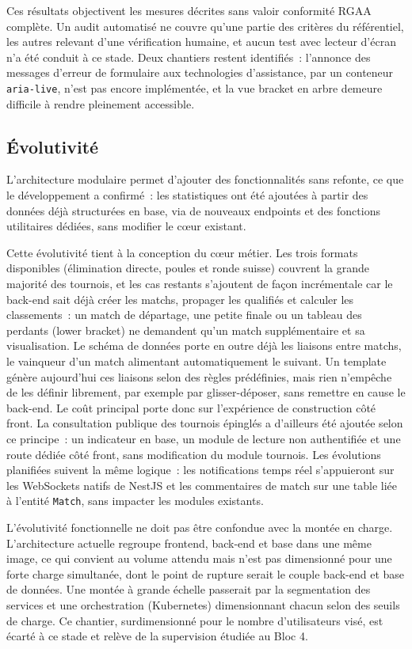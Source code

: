 Ces résultats objectivent les mesures décrites sans valoir conformité RGAA complète. Un audit automatisé ne couvre qu'une partie des critères du référentiel, les autres relevant d'une vérification humaine, et aucun test avec lecteur d'écran n'a été conduit à ce stade. Deux chantiers restent identifiés~: l'annonce des messages d'erreur de formulaire aux technologies d'assistance, par un conteneur \texttt{aria-live}, n'est pas encore implémentée, et la vue bracket en arbre demeure difficile à rendre pleinement accessible.

\subsection{Évolutivité}
L'architecture modulaire permet d'ajouter des fonctionnalités sans refonte, ce que le développement a confirmé~: les statistiques ont été ajoutées à partir des données déjà structurées en base, via de nouveaux endpoints et des fonctions utilitaires dédiées, sans modifier le cœur existant.

Cette évolutivité tient à la conception du cœur métier. Les trois formats disponibles (élimination directe, poules et ronde suisse) couvrent la grande majorité des tournois, et les cas restants s'ajoutent de façon incrémentale car le back-end sait déjà créer les matchs, propager les qualifiés et calculer les classements~: un match de départage, une petite finale ou un tableau des perdants (lower bracket) ne demandent qu'un match supplémentaire et sa visualisation. Le schéma de données porte en outre déjà les liaisons entre matchs, le vainqueur d'un match alimentant automatiquement le suivant. Un template génère aujourd'hui ces liaisons selon des règles prédéfinies, mais rien n'empêche de les définir librement, par exemple par glisser-déposer, sans remettre en cause le back-end. Le coût principal porte donc sur l'expérience de construction côté front. La consultation publique des tournois épinglés a d'ailleurs été ajoutée selon ce principe~: un indicateur en base, un module de lecture non authentifiée et une route dédiée côté front, sans modification du module tournois. Les évolutions planifiées suivent la même logique~: les notifications temps réel s'appuieront sur les WebSockets natifs de NestJS et les commentaires de match sur une table liée à l'entité \texttt{Match}, sans impacter les modules existants.

L'évolutivité fonctionnelle ne doit pas être confondue avec la montée en charge. L'architecture actuelle regroupe frontend, back-end et base dans une même image, ce qui convient au volume attendu mais n'est pas dimensionné pour une forte charge simultanée, dont le point de rupture serait le couple back-end et base de données. Une montée à grande échelle passerait par la segmentation des services et une orchestration (Kubernetes) dimensionnant chacun selon des seuils de charge. Ce chantier, surdimensionné pour le nombre d'utilisateurs visé, est écarté à ce stade et relève de la supervision étudiée au Bloc 4.

